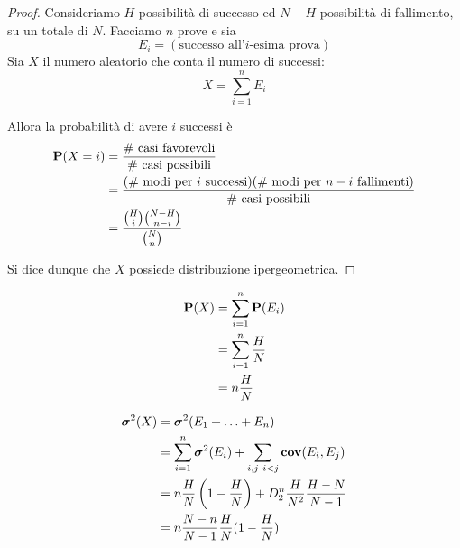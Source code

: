 \begin{proof}
  Consideriamo \( H \) possibilità di successo ed \( N - H \) possibilità di fallimento, su un totale di \( N \).
  Facciamo \( n \) prove e sia
  \[ E_i = (\text{successo all'}i\text{-esima prova}) \]
  Sia \( X \) il numero aleatorio che conta il numero di successi:
  \[ X = \sum_{i = 1}^n E_i \]

  Allora la probabilità di avere \( i \) successi è
  \begin{align*}
    \mathbf{P}(X = i) &= \frac{\text{\# casi favorevoli}}{\text{\# casi possibili}} \\
    &= \frac{(\text{\# modi per }i\text{ successi})(\text{\# modi per }n - i\text{ fallimenti})}{\text{\# casi possibili}} \\
    &= \frac{\binom{H}{i} \binom{N-H}{n-i}}{\binom{N}{n}}
  \end{align*}

  Si dice dunque che \( X \) possiede distribuzione ipergeometrica.
\end{proof}

\begin{proposition}
  \begin{align*}
    \mathbf{P}(X) &= \sum_{i=1}^n \mathbf{P}(E_i) \\
    &= \sum_{i=1}^n \frac{H}{N} \\
    &= n \frac{H}{N}
  \end{align*}
\end{proposition}

\begin{proposition}
  \begin{align*} %
    \var(X) &= \var(E_1 + \ldots + E_n) \\
    &= \sum_{i = 1}^n \var(E_i) + \sum_{i,j ~ i < j} \cov(E_i, E_j) \\ %
    &= n \frac{H}{N} \left( 1 - \frac{H}{N} \right) + D_2^n \frac{H}{N^2} \frac{H - N}{N - 1} \\
    &= n \frac{N - n}{N - 1} \frac{H}{N} (1 - \frac{H}{N})
  \end{align*}
\end{proposition}

